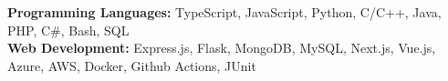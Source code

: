 \vspace{5pt}\item{
    \textbf{Programming Languages:} 
    TypeScript,
    JavaScript,
    Python,
    C/C++,
    Java,
    PHP,
    C\#,
    Bash,
    SQL \\
    
    \textbf{Web Development:} 
    Express.js,
    Flask,
    MongoDB,
    MySQL,
    Next.js,
    Vue.js,
    Azure,
    AWS,
    Docker,
    Github Actions,
    JUnit \\
}
